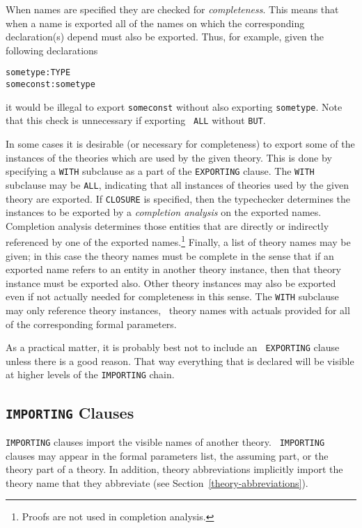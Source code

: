 When names are specified they are checked for {\em completeness\/}.
This means that when a name is exported all of the names on which the
corresponding declaration(s) depend must also be exported.  Thus, for
example, given the following declarations
\begin{alltt}
  sometype: TYPE
  someconst: sometype
\end{alltt}
it would be illegal to export {\tt someconst} without also exporting
{\tt sometype}.  Note that this check is unnecessary if exporting {\tt
ALL} without {\tt BUT}.

In some cases it is desirable (or necessary for completeness) to
export some of the instances of the theories which are used by the
given theory.  This is done by specifying a {\tt WITH} subclause as a
part of the {\tt EXPORTING} clause.  The {\tt WITH} subclause may be
{\tt ALL}, indicating that all instances of theories used by the given
theory are exported.  If {\tt CLOSURE} is specified, then the
typechecker determines the instances to be exported by a {\em
completion analysis\/} on the exported
names.  Completion analysis determines those entities that are
directly or indirectly referenced by one of the exported
names.\footnote{Proofs are not used in completion analysis.} Finally,
a list of theory names may be given; in this case the theory names
must be complete in the sense that if an exported name refers to an
entity in another theory instance, then that theory instance must be
exported also.  Other theory instances may also be exported even if
not actually needed for completeness in this sense.  The {\tt WITH}
subclause may only reference theory instances, \ie\ theory names with
actuals provided for all of the corresponding formal parameters.

As a practical matter, it is probably best not to include an {\tt
EXPORTING} clause unless there is a good reason.  That way everything
that is declared will be visible at higher levels of the {\tt IMPORTING}
chain.


\subsection{{\tt IMPORTING} Clauses}

{\tt IMPORTING} clauses import the visible names of another theory.  {\tt
IMPORTING} clauses may appear in the formal parameters list, the assuming
part, or the theory part of a theory.  In addition, theory abbreviations
implicitly import the theory name that they abbreviate (see
Section~\ref{theory-abbreviations}).

